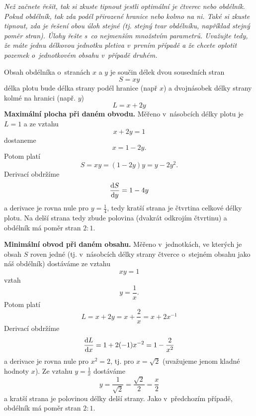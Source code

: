\textit{Než začnete řešit, tak si zkuste tipnout jestli optimální je čtverec
nebo obdélník. Pokud obdélník, tak zda podél přirozené hranice nebo
kolmo na ni. Také si zkuste tipnout, zda je řešení obou úloh stejné
(tj. stejný tvar obdélníku, například stejný poměr stran). Úlohy řešte
s co nejmenším množstvím parametrů. Uvažujte tedy, že máte jednu
délkovou jednotku pletiva v~prvním případě a že chcete oplotit pozemek
o jednotkovém obsahu v~případě druhém.
}

\reseni
Obsah obdélníka o stranách $x$ a $y$ je součin délek dvou sousedních stran
\begin{equation*}
  S=xy
\end{equation*}
délka plotu bude délka strany podél hranice (např $x$) a dvojnásobek délky strany kolmé na hranici (např. $y$)
\begin{equation*}
  L=x+2y
\end{equation*}
\textbf{Maximální plocha při daném obvodu.}
Měřeno v násobcích délky plotu je $L=1$ a ze vztahu
\begin{equation*}
  x+2y=1
\end{equation*}
dostaneme
\begin{equation*}
  x=1-2y.
\end{equation*}
Potom platí
\begin{equation*}
  S=xy=(1-2y)y=y-2y^2.
\end{equation*}
Derivací obdržíme
\begin{equation*}
  \frac{\mathrm{d}S}{\mathrm{d}y}=1-4y
\end{equation*}
a derivace je rovna nule pro $y=\frac 14$, tedy kratší strana je čtvrtina celkové délky plotu. Na delší strana tedy zbude polovina (dvakrát odkrojím čtvrtinu) a obdélník má poměr stran $2:1$.

\textbf{Minimální obvod při daném obsahu.}
Měřeno v jednotkách, ve kterých je obsah $S$ roven jedné (tj. v násobcích délky strany čtverce o stejném obsahu jako náš obdélník) dostáváme ze vztahu
\begin{equation*}
  xy=1
\end{equation*}
vztah
\begin{equation*}
  y=\frac 1x.
\end{equation*}
Potom platí
\begin{equation*}
  L=x+2y=x+\frac 2x=x+2x^{-1}
\end{equation*}
Derivací obdržíme
\begin{equation*}
  \frac{\mathrm{d}L}{\mathrm{d}x}=1+2(-1)x^{-2}=1-\frac 2{x^2}
\end{equation*}
a derivace je rovna nule pro $x^2=2$, tj. pro $x=\sqrt{2}$ (uvažujeme jenom kladné hodnoty $x$). Ze vztahu $y=\frac 1x$ dostáváme
\begin{equation*}
  y=\frac 1{\sqrt 2}=\frac{\sqrt{2}}2=\frac x2
\end{equation*}
a kratší strana je polovinou délky delší strany. Jako v předchozím případě, obdélník má poměr stran $2:1$.

